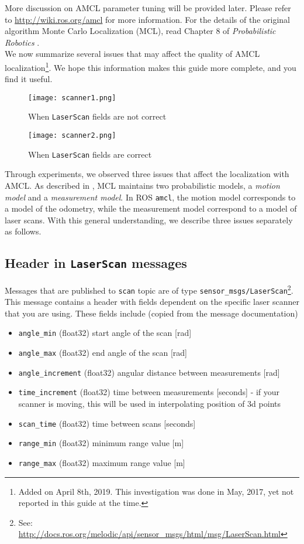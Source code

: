 \documentclass[12pt]{article}
\begin{document}
More discussion on AMCL parameter tuning will be provided later. Please refer to \url{http://wiki.ros.org/amcl} for more information. For the details of the original algorithm Monte Carlo Localization (MCL), read Chapter 8 of \textit{Probabilistic Robotics} \cite{thrun2005probabilistic}.\\

\noindent We now summarize several issues that may affect the quality of AMCL localization\footnote{Added on April 8th, 2019. This investigation was done in May, 2017, yet not reported in this guide at the time.}.  We hope this information makes this guide more complete, and you find it useful.


\begin{figure}[!tb]
    \texttt{[image: scanner1.png]}
    \caption{When \texttt{LaserScan} fields are not correct}
    \label{fig:scanner1}
\endminipage\hfill
{}
  \texttt{[image: scanner2.png]}
  \caption{When \texttt{LaserScan} fields are correct}
  \label{fig:scanner2}
\endminipage\hfill
\end{figure}

Through experiments, we observed three issues that affect the localization with AMCL. As described in \cite{thrun2005probabilistic}, MCL maintains two probabilistic models, a \emph{motion model} and a \emph{measurement model}. In ROS \texttt{amcl}, the motion model corresponds to a model of the odometry, while the measurement model correspond to a model of laser scans. With this general understanding, we describe three issues separately as follows. 

\subsection{Header in \texttt{LaserScan} messages}

Messages that are published to \texttt{scan} topic are of type \texttt{sensor\_msgs/LaserScan}\footnote{See: \url{http://docs.ros.org/melodic/api/sensor_msgs/html/msg/LaserScan.html}}. This message contains a header with fields dependent on the specific laser scanner that you are using. These fields include (copied from the message documentation)

\begin{itemize}
\item \texttt{angle\_min} (float32) start angle of the scan [rad]
\item \texttt{angle\_max} (float32) end angle of the scan [rad]
\item \texttt{angle\_increment} (float32) angular distance between measurements [rad]
\item \texttt{time\_increment} (float32) time between measurements [seconds] - if your scanner is moving, this will be used in interpolating position of 3d points
\item \texttt{scan\_time} (float32) time between scans [seconds]
\item \texttt{range\_min} (float32) minimum range value [m]
\item \texttt{range\_max} (float32) maximum range value [m]
\end{itemize}
\end{document}
